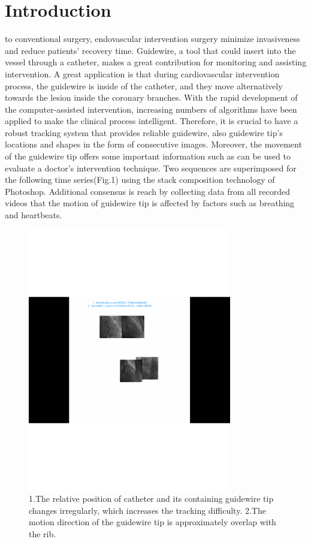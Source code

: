 \documentclass[journal]{IEEEtran}
\begin{document}
\IEEEpeerreviewmaketitle



\section{Introduction}
to conventional surgery, endovascular intervention surgery minimize invasiveness and reduce patients' recovery time. Guidewire, a tool that could insert into the vessel through a catheter, makes a great contribution for monitoring and assisting intervention. A great application is that during cardiovascular intervention process, the guidewire is inside of the catheter, and they move alternatively towards the lesion inside the coronary branches. With the rapid development of the computer-assisted intervention, increasing numbers of algorithms have been applied to make the clinical process intelligent. Therefore, it is crucial to have a robust tracking system that provides reliable guidewire, also guidewire tip's locations and shapes in the form of consecutive images. Moreover, the movement of the guidewire tip offers some important information such as can be used to evaluate a doctor's intervention technique. Two sequences are superimposed for the following time series(Fig.1) using the stack composition technology of Photoshop. Additional consensus is reach by collecting data from all recorded videos that the motion of guidewire tip is affected by factors such as breathing and heartbeats.

\begin{figure}[!hbtp] 
	\centering
	\includegraphics[width=3.5in]{figures/figure1}
		\caption{1.The relative position of catheter and its containing guidewire tip changes irregularly, which increases the tracking difficulty. 2.The motion direction of the guidewire tip is approximately overlap with the rib. } 
	\label{fig:mcmthesis-logo} 
\end{figure}
\end{document}
